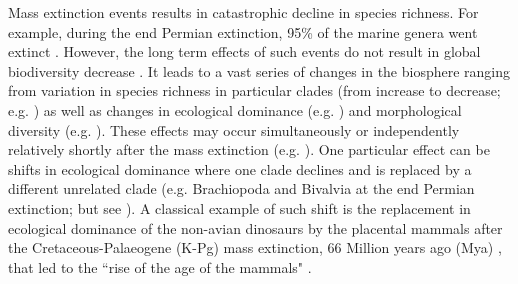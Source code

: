 \documentclass[12pt,letterpaper]{article}
\begin{document}
Mass extinction events results in catastrophic decline in species richness. For example, during the end Permian extinction, 95\% of the marine genera went extinct \cite{RaupPT,BentonPT}. However, the long term effects of such events do not result in global biodiversity decrease \cite{Erwin1998344}. It leads to a vast series of changes in the biosphere ranging from variation in species richness in particular clades (from increase to decrease; e.g. \cite{Benton85,Erwin1998344,fritzdiversity2013}) as well as changes in ecological dominance (e.g. \cite{Brusatte12092008,toljagictriassic-jurassic2013,bensonfaunal2014}) and morphological diversity (e.g. \cite{friedmanexplosive2010,brusattedinosaur2012}). These effects may occur simultaneously or independently \cite{slaterCetacean,ruta2013,hopkinsdecoupling2013} relatively shortly after the mass extinction (e.g. \cite{friedmanexplosive2010,toljagictriassic-jurassic2013}). One particular effect can be shifts in ecological dominance where one clade declines and is replaced by a different unrelated clade (e.g. Brachiopoda and Bivalvia at the end Permian extinction; \cite{Sepkiski1981,CLAPHAM01102006} but see \cite{Payne22052014}). A classical example of such shift is the replacement in ecological dominance of the non-avian dinosaurs by the placental mammals after the Cretaceous-Palaeogene (K-Pg) mass extinction, 66 Million years ago (Mya) \cite{rennetime2013}, that led to the ``rise of the age of the mammals" \cite{archibald2011extinction,Lovergrove}.
\end{document}
